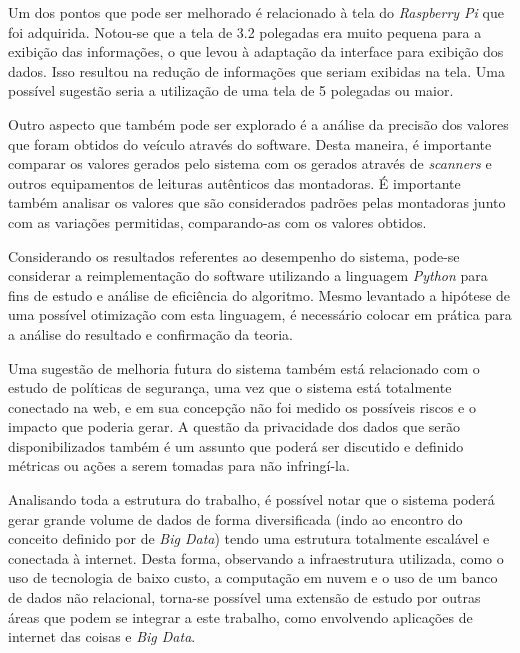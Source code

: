 Um dos pontos que pode ser melhorado é relacionado à tela do \textit{Raspberry Pi} que foi adquirida. Notou-se que a tela de 3.2 polegadas era muito pequena para a exibição das informações, o que levou à adaptação da interface para exibição dos dados. Isso resultou na redução de informações que seriam exibidas na tela. Uma possível sugestão seria a utilização de uma tela de 5 polegadas ou maior.

Outro aspecto que também pode ser explorado é a análise da precisão dos valores que foram obtidos do veículo através do software. Desta maneira, é importante comparar os valores gerados pelo sistema com os gerados através de \textit{scanners} e outros equipamentos de leituras autênticos das montadoras. É importante também analisar os valores que são considerados padrões pelas montadoras junto com as variações permitidas, comparando-as com os valores obtidos.

Considerando os resultados referentes ao desempenho do sistema, pode-se considerar a reimplementação do software utilizando a linguagem \textit{Python} para fins de estudo e análise de eficiência do algoritmo. Mesmo levantado a hipótese de uma possível otimização com esta linguagem, é necessário colocar em prática para a análise do resultado e confirmação da teoria.

Uma sugestão de melhoria futura do sistema também está relacionado com o estudo de políticas de segurança, uma vez que o sistema está totalmente conectado na web, e em sua concepção não foi medido os possíveis riscos e o impacto que poderia gerar. A questão da privacidade dos dados que serão disponibilizados também é um assunto que poderá ser discutido e definido métricas ou ações a serem tomadas para não infringí-la.

Analisando toda a estrutura do trabalho, é possível notar que o sistema poderá gerar grande volume de dados de forma diversificada (indo ao encontro do conceito definido por \citeauthor{chede} de \textit{Big Data}) tendo uma estrutura totalmente escalável e conectada à internet. Desta forma, observando a infraestrutura utilizada, como o uso de tecnologia de baixo custo, a computação em nuvem e o uso de um banco de dados não relacional, torna-se possível uma extensão de estudo por outras áreas que podem se integrar a este trabalho, como envolvendo aplicações de internet das coisas e \textit{Big Data}.
